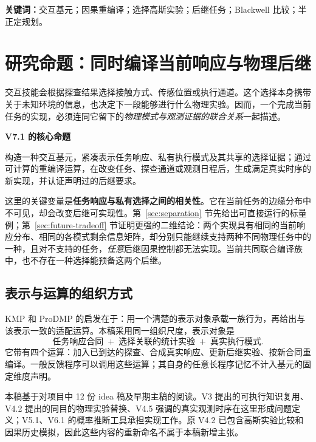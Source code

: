 \documentclass[UTF8,fontset=fandol,11pt,a4paper]{ctexart}
\theoremstyle{definition}
\theoremstyle{remark}
\numberwithin{equation}{section}
\begin{document}
\vspace{2mm}
\noindent\textbf{关键词：}交互基元；因果重编译；选择高斯实验；后继任务；Blackwell 比较；半正定规划。

\clearpage
\setcounter{tocdepth}{1}
\tableofcontents
\clearpage
\section{研究命题：同时编译当前响应与物理后继}
\label{sec:idea}

交互技能会根据探查结果选择接触方式、传感位置或执行通道。这个选择本身携带关于未知环境的信息，也决定下一段能够进行什么物理实验。因而，一个完成当前任务的实现，必须连同它留下的\emph{物理模式与观测证据的联合关系}一起描述。

\begin{keybox}
\textbf{V7.1 的核心命题}\par
构造一种交互基元，紧凑表示任务响应、私有执行模式及其共享的选择证据；通过可计算的重编译运算，在改变任务、探查通道或观测日程后，生成满足真实时序的新实现，并认证声明过的后继要求。
\end{keybox}

这里的关键变量是\textbf{任务响应与私有选择之间的相关性}。它在当前任务的边缘分布中不可见，却会改变后继可实现性。第~\ref{sec:separation} 节先给出可直接运行的标量例；第~\ref{sec:future-tradeoff} 节证明更强的二维结论：两个实现具有相同的当前响应分布、相同的各模式剩余信息矩阵，却分别只能继续支持两种不同物理任务中的一种，且对不支持的任务，\emph{任意}后继因果控制都无法实现。当前共同联合编译族中，也不存在一种选择能预备这两个后继。

\subsection{表示与运算的组织方式}
KMP 和 ProDMP 的启发在于：用一个清楚的表示对象承载一族行为，再给出与该表示一致的适配运算\cite{kmp,prodmp}。本稿采用同一组织尺度，表示对象是
\begin{equation}
 \boxed{\text{任务响应合同}\; +\; \text{选择关联的统计实验}\; +\; \text{真实执行模式}.}
 \label{eq:newprimitive}
\end{equation}
它带有四个运算：加入已到达的探查、合成真实响应、更新后继实验、按新合同重编译。一般反馈程序可以调用这些运算；其自身的任意长程序记忆不计入基元的固定维度声明。

本稿基于对项目中 12 份 idea 稿及早期主稿的阅读。V3 提出的可执行知识复用、V4.2 提出的同目的物理实验替换、V4.5 强调的真实观测时序在这里形成问题定义；V5.1、V6.1 的概率推断工具承担实现工作。原 V4.2 已包含高斯实验比较和因果历史模拟，因此这些内容的重新命名不属于本稿新增主张。
\end{document}
